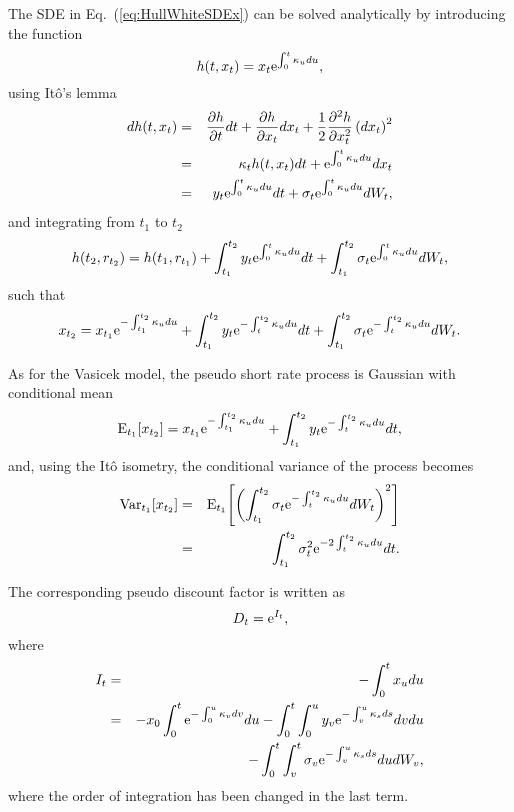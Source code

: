 The SDE in Eq.~(\ref{eq:HullWhiteSDEx}) can be solved analytically by introducing the function
\begin{equation}
h(t, x_t) = x_t \text{e}^{\int_0^t \kappa_u du},
\end{equation}
using It\^{o}'s lemma
\begin{eqnarray}
dh(t, x_t) &=& \frac{\partial h}{\partial t} dt + \frac{\partial h}{\partial x_t} dx_t + \frac{1}{2}\frac{\partial^2 h}{\partial x_t^2} \left(dx_t\right)^2 \\
&=& \kappa_t h(t, x_t) dt + \text{e}^{\int_0^t \kappa_u du} dx_t \\
&=& y_t \text{e}^{\int_0^t \kappa_u du} dt + \sigma_t \text{e}^{\int_0^t \kappa_u du} dW_t,
\end{eqnarray}
and integrating from $t_1$ to $t_2$
\begin{equation}
h(t_2, r_{t_2}) = h(t_1, r_{t_1}) + \int_{t_1}^{t_2} y_t \text{e}^{\int_0^t \kappa_u du} dt + \int_{t_1}^{t_2} \sigma_t \text{e}^{\int_0^t \kappa_u du} dW_t,
\end{equation}
such that
\begin{equation}
x_{t_2} = x_{t_1} \text{e}^{-\int_{t_1}^{t_2} \kappa_u du}  + \int_{t_1}^{t_2} y_t \text{e}^{-\int_t^{t_2} \kappa_u du} dt + \int_{t_1}^{t_2} \sigma_t \text{e}^{-\int_t^{t_2} \kappa_u du} dW_t.
\end{equation}

As for the Vasicek model, the pseudo short rate process is Gaussian with conditional mean
\begin{equation}
\mathrm{E}_{t_1}\! \left[ x_{t_2} \right] = x_{t_1} \text{e}^{-\int_{t_1}^{t_2} \kappa_u du}  + \int_{t_1}^{t_2} y_t \text{e}^{-\int_t^{t_2} \kappa_u du} dt,
\end{equation}
and, using the It\^{o} isometry, the conditional variance of the process becomes
\begin{eqnarray}
\mathrm{Var}_{t_1}\! \left[ x_{t_2} \right] &=& \mathrm{E}_{t_1}\! \left[ \left( \int_{t_1}^{t_2} \sigma_t \text{e}^{-\int_t^{t_2} \kappa_u du} dW_t \right)^2 \right] \\
&=& \int_{t_1}^{t_2} \sigma_t^2 \text{e}^{-2\int_t^{t_2} \kappa_u du} dt.
\end{eqnarray}

The corresponding pseudo discount factor is written as
\begin{equation}
D_{t} = \text{e}^{I_t},
\end{equation}
where
\begin{eqnarray}
I_t &=& -\int_0^t x_u du \\
&=& - x_{0} \int_0^t \text{e}^{-\int_{0}^{u} \kappa_v dv} du - \int_0^t\int_{0}^{u} y_v \text{e}^{-\int_v^{u} \kappa_s ds} dv du \\
&& - \int_0^t \int_{v}^{t} \sigma_v \text{e}^{-\int_v^{u} \kappa_s ds} du dW_v,
\end{eqnarray}
where the order of integration has been changed in the last term.


